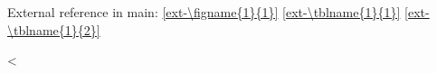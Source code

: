 \documentclass[12pt, lettersize]{article}
\begin{document}

\newpage



\newpage





External reference in main:
\ref{ext-\figname{1}{1}}
\ref{ext-\tblname{1}{1}}
\ref{ext-\tblname{1}{2}}

\newpage
<%

\newpage
\appendix


\end{document}
